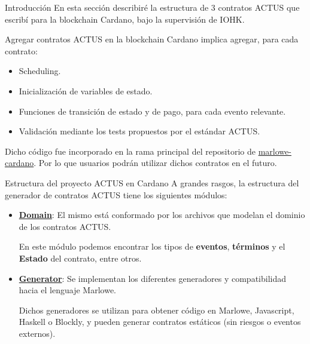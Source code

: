 \documentclass{beamer}
\newcommand{\nologo}{\setbeamertemplate{logo}{}} %
\begin{document}
{\nologo
\begin{frame}{Introducción}
En esta sección describiré la estructura de 3 contratos ACTUS que escribí para la blockchain Cardano, bajo la supervisión de IOHK.\@

\vfill
\pause

Agregar contratos ACTUS en la blockchain Cardano implica agregar, para cada contrato:

\begin{itemize}
        \pause
    \item Scheduling.
        \pause
    \item Inicialización de variables de estado.
        \pause
    \item Funciones de transición de estado y de pago, para cada evento relevante.
        \pause
    \item Validación mediante los tests propuestos por el estándar ACTUS.
\end{itemize}

\pause
\vfill

Dicho código fue incorporado en la rama principal del repositorio de \href{https://github.com/input-output-hk/marlowe-cardano}{marlowe-cardano}. Por lo que usuarios podrán utilizar dichos contratos en el futuro.
\end{frame}
}

\begin{frame}[fragile]{Estructura del proyecto ACTUS en Cardano}
A grandes rasgos, la estructura del generador de contratos ACTUS tiene los siguientes módulos:
    \vfill
    
\begin{itemize}
    \item  \textbf{\underline{Domain}}: El mismo está conformado por los archivos que modelan el dominio de los contratos ACTUS.

        \medskip

        En este módulo podemos encontrar los tipos de \textbf{eventos}, \textbf{términos} y el \textbf{Estado} del contrato, entre otros.
        \pause
        \vfill

    \item \textbf{\underline{Generator}}: Se implementan los diferentes generadores y compatibilidad hacia el lenguaje Marlowe. 

        \medskip

        Dichos generadores se utilizan para obtener código en Marlowe, Javascript, Haskell o Blockly, y pueden generar contratos estáticos (sin riesgos o eventos externos).
\end{itemize}
\end{frame}
\end{document}
